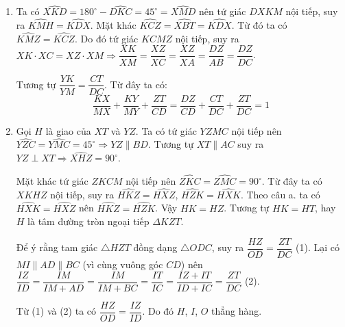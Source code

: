 \begin{ex}
{\begin{enumerate}
Mặt khác vì $BXTC$ nội tiếp nên $\widehat{KCD}=\widehat{DBM}=\widehat{DCM}$, tứ giác $ADZY$ nội tiếp nên $\widehat{KDC}=\widehat{CAM}=\widehat{CDM}$. Vậy $\triangle DKC=\triangle DMC\Rightarrow \widehat{DKC}=\widehat{DMC}=135^\circ$.

\item Ta có  $\widehat{XKD}=180^\circ-\widehat{DKC}=45^\circ=\widehat{XMD}$ nên tứ giác $DXKM$ nội tiếp, suy ra $\widehat{KMH}=\widehat{KDX}$.
Mặt khác $\widehat{KCZ}=\widehat{XBT}=\widehat{KDX}$. Từ đó ta có $\widehat{KMZ}=\widehat{KCZ}$. Do đó tứ giác $KCMZ$ nội tiếp, suy ra $XK\cdot XC=XZ\cdot XM\Rightarrow \dfrac{XK}{XM}=\dfrac{XZ}{XC}=\dfrac{XZ}{XA}=\dfrac{DZ}{AB}=\dfrac{DZ}{DC}$.

Tương tự $\dfrac{YK}{YM}=\dfrac{CT}{DC}$. Từ đây ta có: $$\dfrac{KX}{MX}+\dfrac{KY}{MY}+\dfrac{ZT}{CD}=\dfrac{DZ}{CD}+\dfrac{CT}{DC}+\dfrac{ZT}{DC}=1$$

\item Gọi $H$ là giao của $XT$ và $YZ$.
Ta có tứ giác $YZMC$ nội tiếp nên $\widehat{YZC}=\widehat{YMC}=45^\circ\Rightarrow YZ\parallel BD$. Tương tự $XT\parallel AC$ suy ra $YZ\perp XT\Rightarrow \widehat{XHZ}=90^\circ$.

Mặt khác tứ giác $ZKCM$ nội tiếp nên $\widehat{ZKC}=\widehat{ZMC}=90^\circ$. Từ đây ta có $XKHZ$ nội tiếp, suy ra $\widehat{HKZ}=\widehat{HXZ}$, $\widehat{HZK}=\widehat{HXK}$. Theo câu a. ta có $\widehat{HXK}=\widehat{HXZ}$ nên $\widehat{HKZ}=\widehat{HZK}$. Vậy $HK=HZ$. Tương tự $HK=HT$, hay $H$ là tâm đường tròn ngoại tiếp $\Delta KZT$.
 
 Để ý rằng tam giác $\triangle HZT$ đồng dạng $\triangle ODC$, suy ra $\dfrac{HZ}{OD}=\dfrac{ZT}{DC}$ (1). Lại có $MI\parallel AD\parallel BC$ (vì cùng vuông góc $CD$) nên
 $\dfrac{IZ}{ID}=\dfrac{IM}{IM+AD}=\dfrac{IM}{IM+BC}=\dfrac{IT}{IC}=\dfrac{IZ+IT}{ID+IC}=\dfrac{ZT}{DC}$ (2).
 
 Từ (1) và (2) ta có $\dfrac{HZ}{OD}=\dfrac{IZ}{ID}$. Do đó $H$, $I$, $O$ thẳng hàng.
\end{enumerate}}
\end{ex}
